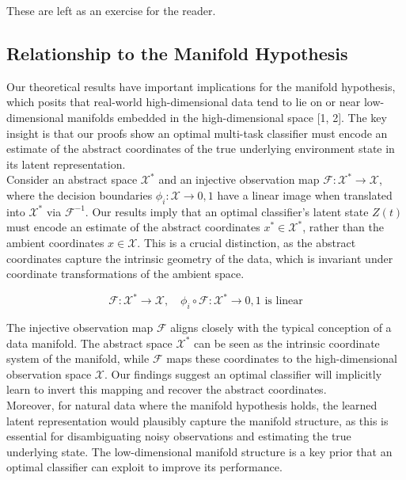 \documentclass[12pt]{article}
\begin{document}
These are left as an exercise for the reader. 


\subsection{Relationship to the Manifold Hypothesis}

Our theoretical results have important implications for the manifold hypothesis, which posits that real-world high-dimensional data tend to lie on or near low-dimensional manifolds embedded in the high-dimensional space [1, 2]. The key insight is that our proofs show an optimal multi-task classifier must encode an estimate of the abstract coordinates of the true underlying environment state in its latent representation.\\ 

Consider an abstract space $\mathcal{X}^*$ and an injective observation map $\mathcal{F}: \mathcal{X}^* \to \mathcal{X}$, where the decision boundaries $\phi_i : \mathcal{X} \to {0, 1}$ have a linear image when translated into $\mathcal{X}^*$ via $\mathcal{F}^{-1}$. 
Our results imply that an optimal classifier's latent state $Z(t)$ must encode an estimate of the abstract coordinates $x^* \in \mathcal{X}^*$, rather than the ambient coordinates $x \in \mathcal{X}$. 
This is a crucial distinction, as the abstract coordinates capture the intrinsic geometry of the data, which is invariant under coordinate transformations of the ambient space.

\begin{equation}
\mathcal{F}: \mathcal{X}^* \to \mathcal{X}, \quad \phi_i \circ \mathcal{F}: \mathcal{X}^* \to {0, 1} \text{ is linear}
\end{equation}

The injective observation map $\mathcal{F}$ aligns closely with the typical conception of a data manifold. 
The abstract space $\mathcal{X}^*$ can be seen as the intrinsic coordinate system of the manifold, while $\mathcal{F}$ maps these coordinates to the high-dimensional observation space $\mathcal{X}$. 
Our findings suggest an optimal classifier will implicitly learn to invert this mapping and recover the abstract coordinates.\\

Moreover, for natural data where the manifold hypothesis holds, the learned latent representation would plausibly capture the manifold structure, as this is essential for disambiguating noisy observations and estimating the true underlying state. 
The low-dimensional manifold structure is a key prior that an optimal classifier can exploit to improve its performance. \\
\end{document}
